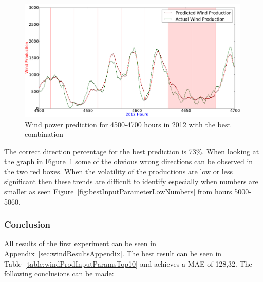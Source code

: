 \begin{figure}[ht!]
\centering
\includegraphics[width=0.99\textwidth]{billeder/bestInputCombi4500-4700.png}
\caption{Wind power prediction for 4500-4700 hours in 2012 with the best combination}
\label{fig:bestInputCombi4500-4700}
\end{figure} 

The correct direction percentage for the best prediction is 73\%. When looking at the graph in Figure~\ref{fig:bestInputCombi4500-4700} some of the obvious wrong directions can be observed in the two red boxes. When the volatility of the productions are low or less significant then these trends are difficult to identify especially when numbers are smaller as seen Figure~\ref{fig:bestInputParameterLowNumbers} from hours 5000-5060.

\subsubsection{Conclusion}
All results of the first experiment can be seen in Appendix~\ref{sec:windResultsAppendix}. The best result can be seen in Table~\ref{table:windProdInputParamsTop10} and achieves a MAE of 128,32. The following conclusions can be made: 

